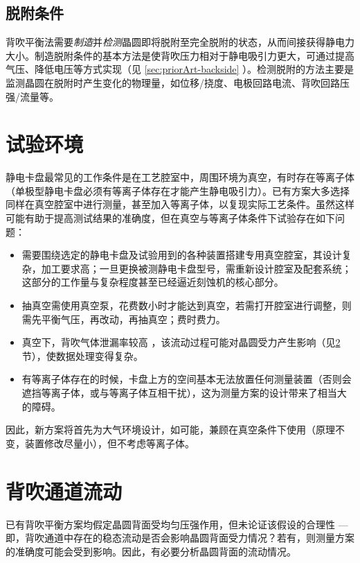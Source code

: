 \subsection{脱附条件}\label{sec:principle-backside-dechuck}

背吹平衡法需要\emph{制造}并\emph{检测}晶圆即将脱附至完全脱附的状态，从而间接获得静电力大小。制造脱附条件的基本方法是使背吹压力相对于静电吸引力更大，可通过提高气压、降低电压等方式实现（见 \ref{sec:priorArt-backside} ）。检测脱附的方法主要是监测晶圆在脱附时产生变化的物理量，如位移/挠度、电极回路电流、背吹回路压强/流量等。 %



\section{试验环境}\label{sec:principle-env}

静电卡盘最常见的工作条件是在工艺腔室中，周围环境为真空，有时存在等离子体（单极型静电卡盘必须有等离子体存在才能产生静电吸引力）。已有方案大多选择同样在真空腔室中进行测量，甚至加入等离子体，以复现实际工艺条件。虽然这样可能有助于提高测试结果的准确度，但在真空与等离子体条件下试验存在如下问题：
\begin{itemize}
  \item 需要围绕选定的静电卡盘及试验用到的各种装置搭建专用真空腔室，其设计复杂，加工要求高；一旦更换被测静电卡盘型号，需重新设计腔室及配套系统；这部分的工作量与复杂程度甚至已经逼近刻蚀机的核心部分。
  \item 抽真空需使用真空泵，花费数小时才能达到真空，若需打开腔室进行调整，则需先平衡气压，再改动，再抽真空；费时费力。
  \item 真空下，背吹气体泄漏率较高 %
  ，该流动过程可能对晶圆受力产生影响（见\ref{sec:principle-flow}节），使数据处理变得复杂。
  \item 有等离子体存在的时候，卡盘上方的空间基本无法放置任何测量装置（否则会遮挡等离子体，或与等离子体互相干扰），这为测量方案的设计带来了相当大的障碍。
\end{itemize}

因此，新方案将首先为大气环境设计，如可能，兼顾在真空条件下使用（原理不变，装置修改尽量小），但不考虑等离子体。



\section{背吹通道流动}\label{sec:principle-flow}

已有背吹平衡方案均假定晶圆背面受均匀压强作用，但未论证该假设的合理性 ---  即，背吹通道中存在的稳态流动是否会影响晶圆背面受力情况？若有，则测量方案的准确度可能会受到影响。因此，有必要分析晶圆背面的流动情况。



